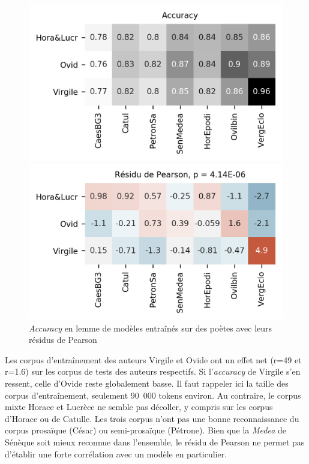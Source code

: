\begin{figure}[ht]
    \hspace*{-0.05\linewidth}
    \begin{minipage}[c]{0.55\linewidth}
        \includegraphics[width=1\linewidth]{results/lemmatisation/longreeVariante/LongreeVariante-AccuracyStyleDePoesie-Lemme.png}
    \end{minipage} \hfill
    \begin{minipage}[c]{0.55\linewidth}
        \includegraphics[width=1\linewidth]{results/lemmatisation/longreeVariante/LongreeVariante-AssocPlotStyleDePoesie-Lemme.png}
    \end{minipage}
    \caption{\textit{Accuracy} en lemme de modèles entraînés sur des poètes avec leurs résidus de Pearson}
    \label{fig:lemmatisation:longree:poetes}
\end{figure}

Les corpus d'entraînement des auteurs Virgile et Ovide ont un effet net (r=49 et r=1.6) sur les corpus de tests des auteurs respectifs. Si l'\textit{accuracy} de Virgile s'en ressent, celle d'Ovide reste globalement basse. Il faut rappeler ici la taille des corpus d'entraînement, seulement 90~000 tokens environ. Au contraire, le corpus mixte Horace et Lucrèce ne semble pas décoller, y compris sur les corpus d'Horace ou de Catulle. Les trois corpus n'ont pas une bonne reconnaissance du corpus prosaïque (César) ou semi-prosaïque (Pétrone). Bien que la \textit{Medea} de Sénèque soit mieux reconnue dans l'ensemble, le résidu de Pearson ne permet pas d'établir une forte corrélation avec un modèle en particulier.

